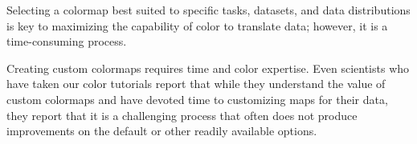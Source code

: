 \documentclass{IEEEcsmag}
\newcommand*{\km}[1]{\textcolor{km}{\emph{\textbf{#1} -- KM}}}
\newcommand*{\fs}[1]{\textcolor{fs}{\emph{\textbf{#1} -- FS}}}
\begin{document}




Selecting a colormap best suited to specific tasks, datasets, and data distributions is key to maximizing the capability of color to translate data; however, it is a time-consuming process.

Creating custom colormaps requires time and color expertise. Even scientists who have taken our color tutorials report that while they understand the value of custom colormaps and have devoted time to customizing maps for their data, they report that it is a challenging process that often does not produce improvements on the default or other readily available options.



\end{document}
